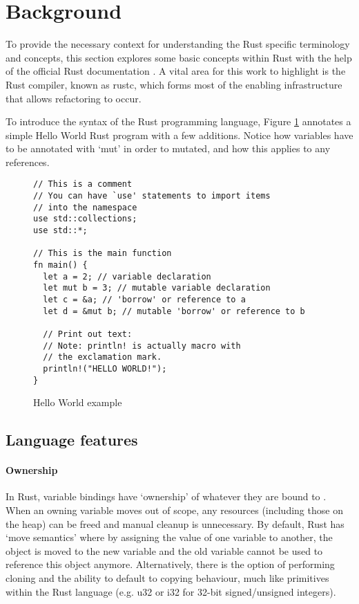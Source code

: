 \section{Background}\label{C:back} 

To provide the necessary context for understanding the Rust specific terminology and concepts, this section explores some basic concepts within Rust with the help of the official Rust documentation \cite{doc15}. A vital area for this work to highlight is the Rust compiler, known as rustc, which forms most of the enabling infrastructure that allows refactoring to occur. 

To introduce the syntax of the Rust programming language, Figure \ref{Fig:hello} annotates a simple Hello World Rust program with a few additions. Notice how variables have to be annotated with `mut' in order to mutated, and how this applies to any references.

\begin{figure}[h]
\centering
\begin{verbatim}
// This is a comment
// You can have `use' statements to import items
// into the namespace
use std::collections;
use std::*;

// This is the main function
fn main() {
  let a = 2; // variable declaration
  let mut b = 3; // mutable variable declaration
  let c = &a; // 'borrow' or reference to a
  let d = &mut b; // mutable 'borrow' or reference to b

  // Print out text:
  // Note: println! is actually macro with
  // the exclamation mark.
  println!("HELLO WORLD!");
}
\end{verbatim}
\caption{Hello World example}
\label{Fig:hello}
\end{figure}

\subsection{Language features}

\paragraph{Ownership}
In Rust, variable bindings have `ownership' of whatever they are bound to \cite{docowner15}. When an owning variable moves out of scope, any resources (including those on the heap) can be freed and manual cleanup is unnecessary. By default, Rust has `move semantics' where by assigning the value of one variable to another, the object is moved to the new variable and the old variable cannot be used to reference this object anymore. Alternatively, there is the option of performing cloning and the ability to default to copying behaviour, much like primitives within the Rust language (e.g. u32 or i32 for 32-bit signed/unsigned integers).

